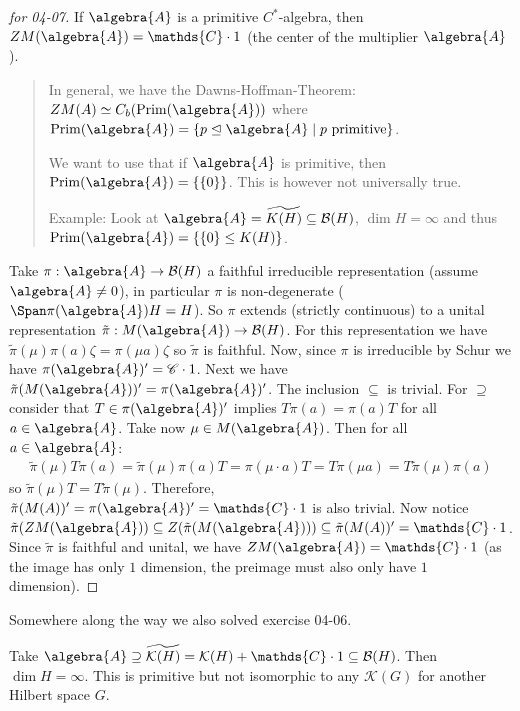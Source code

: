 \documentclass[a4paper]{article}
\begin{document}
\begin{proof}[for 04-07]
	If $\algebra{A}$ is a primitive $C^*$-algebra, then $ZM(\algebra{A}) = \mathds{C} \cdot 1$ (the center of the multiplier $\algebra{A}$).
	\begin{quote}
		In general, we have the Dawns-Hoffman-Theorem: $ZM(A) \simeq C_b(\mathrm{Prim}(\algebra{A}))$ where $\mathrm{Prim}(\algebra{A}) = \{ p \trianglelefteq \algebra{A} \mid p \text{ primitive} \}$.

		We want to use that if $\algebra{A}$ is primitive, then $\mathrm{Prim}(\algebra{A}) = \{\{0\}\}$. This is however not universally true.

		Example: Look at $\algebra{A} = \widetilde{K(H)} \subseteq \mathcal{B}(H)$, $\dim H = \infty$ and thus $\mathrm{Prim}(\algebra{A}) = \{\{0\} \leq K(H)\}$.
	\end{quote}
	Take $\pi: \algebra{A} \to \mathcal{B}(H)$ a faithful irreducible representation (assume $\algebra{A} \neq 0$), in particular $\pi$ is non-degenerate ($\Span \pi(\algebra{A}) H = H$).
	So $\pi$ extends (strictly continuous) to a unital representation $\tilde{\pi}: M(\algebra{A}) \to \mathcal{B}(H)$.
	For this representation we have $\tilde{\pi}(\mu) \pi(a) \zeta = \pi(\mu a) \zeta$ so $\tilde{\pi}$ is faithful.
	Now, since $\pi$ is irreducible by Schur we have $\pi(\algebra{A})' = \mathscr{C} \cdot 1$.
	Next we have $\tilde{\pi}(M(\algebra{A}))' = \pi(\algebra{A})'$.
	The inclusion $\subseteq$ is trivial.
	For $\supseteq$ consider that $T \in {\pi}(\algebra{A})'$ implies $T {\pi}(a) = {\pi}(a) T$ for all $a \in \algebra{A}$.
	Take now $\mu \in M(\algebra{A})$.
	Then for all $a \in \algebra{A}$:
	\begin{align*}
		\tilde{\pi}(\mu)T\pi(a) = \tilde{\pi}(\mu) \pi(a) T = \pi(\mu \cdot a) T = T \pi(\mu a) = T \tilde{\pi}(\mu) \pi(a)
	\end{align*}
	so $\tilde{\pi}(\mu)T = T \tilde{\pi}(\mu)$. 
	Therefore, $\tilde{\pi}(M(A))' = \pi(\algebra{A})' = \mathds{C} \cdot 1$ is also trivial.
	Now notice $\tilde{\pi}(ZM(\algebra{A})) \subseteq Z(\tilde{\pi}(M(\algebra{A}))) \subseteq \tilde{\pi}(M(A))' = \mathds{C} \cdot 1$.
	Since $\tilde{\pi}$ is faithful and unital, we have $ZM(\algebra{A}) = \mathds{C} \cdot 1$ (as the image has only $1$ dimension, the preimage must also only have $1$ dimension).
\end{proof}

Somewhere along the way we also solved exercise 04-06.

\begin{example}
	Take $\algebra{A} \supseteq \widetilde{\mathcal{K}(H)} = \mathcal{K}(H) + \mathds{C}\cdot 1 \subseteq \mathcal{B}(H)$. Then $\dim H = \infty$.
	This is primitive but not isomorphic to any $\mathcal{K}(G)$ for another Hilbert space $G$.
\end{example}
\end{document}
